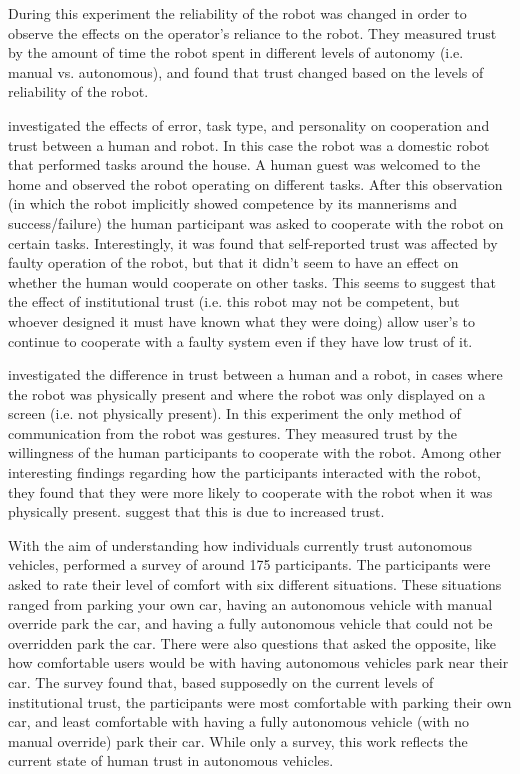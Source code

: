 During this experiment the reliability of the robot was changed in order to observe the effects on the operator's reliance to the robot. They measured trust by the amount of time the robot spent in different levels of autonomy (i.e. manual vs. autonomous), and found that trust changed based on the levels of reliability of the robot.

\citet{Salem2015-md} investigated the effects of error, task type, and personality on cooperation and trust between a human and robot. In this case the robot was a domestic robot that performed tasks around the house. A human guest was welcomed to the home and observed the robot operating on different tasks. After this observation (in which the robot implicitly showed competence by its mannerisms and success/failure) the human participant was asked to cooperate with the robot on certain tasks. Interestingly, it was found that self-reported trust was affected by faulty operation of the robot, but that it didn't seem to have an effect on whether the human would cooperate on other tasks. This seems to suggest that the effect of institutional trust (i.e. this robot may not be competent, but whoever designed it must have known what they were doing) allow user's to continue to cooperate with a faulty system even if they have low trust of it.

\citet{Bainbridge2011-pl} investigated the difference in trust between a human and a robot, in cases where the robot was physically present and where the robot was only displayed on a screen (i.e. not physically present). In this experiment the only method of communication from the robot was gestures. They measured trust by the willingness of the human participants to cooperate with the robot. Among other interesting findings regarding how the participants interacted with the robot, they found that they were more likely to cooperate with the robot when it was physically present. \citeauthor{Bainbridge2011-pl} suggest that this is due to increased trust.

With the aim of understanding how individuals currently trust autonomous vehicles, \citet{Munjal_Desai2009-en} performed a survey of around 175 participants. The participants were asked to rate their level of comfort with six different situations. These situations ranged from parking your own car, having an autonomous vehicle with manual override park the car, and having a fully autonomous vehicle that could not be overridden park the car. There were also questions that asked the opposite, like how comfortable users would be with having autonomous vehicles park near their car. The survey found that, based supposedly on the current levels of institutional trust, the participants were most comfortable with parking their own car, and least comfortable with having a fully autonomous vehicle (with no manual override) park their car. While only a survey, this work reflects the current state of human trust in autonomous vehicles. 

